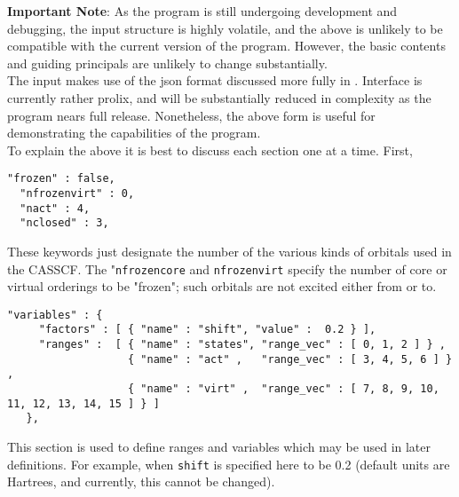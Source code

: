 \noindent \textbf{Important Note}: As the program is still undergoing development and debugging, 
the input structure is highly volatile, and the above is unlikely to be compatible with
the current version of the program. However, the basic contents and guiding principals
are unlikely to change substantially.\\

\noindent The input makes use of the json format discussed more fully in  \cite{JSON}.
Interface is currently rather prolix, and will be substantially reduced in complexity
as the program nears full release. Nonetheless, the above form is useful for demonstrating the capabilities
of the program. \\

\noindent To explain the above it is best to discuss each section one at a time. First,
\begin{lstlisting}[label={lst:casscf}]
  "frozen" : false,
  "nfrozenvirt" : 0,
  "nact" : 4,
  "nclosed" : 3,
\end{lstlisting}         
\noindent These keywords just designate the number of the various kinds of orbitals used in the CASSCF.
The "\texttt{nfrozencore} and \texttt{nfrozenvirt} specify the number of core or virtual orderings to be "frozen";
such orbitals are not excited either from or to.\\

\begin{lstlisting}[label={lst:variables}]
  "variables" : {
     "factors" : [ { "name" : "shift", "value" :  0.2 } ],
     "ranges" :  [ { "name" : "states", "range_vec" : [ 0, 1, 2 ] } ,
                   { "name" : "act" ,   "range_vec" : [ 3, 4, 5, 6 ] } ,
                   { "name" : "virt" ,  "range_vec" : [ 7, 8, 9, 10, 11, 12, 13, 14, 15 ] } ]
   },
\end{lstlisting}         
\noindent This section is used to define ranges and variables which may be used in later definitions. For example,
when \texttt{shift} is specified here to be 0.2 (default units are Hartrees, and currently, this cannot be 
changed). 

